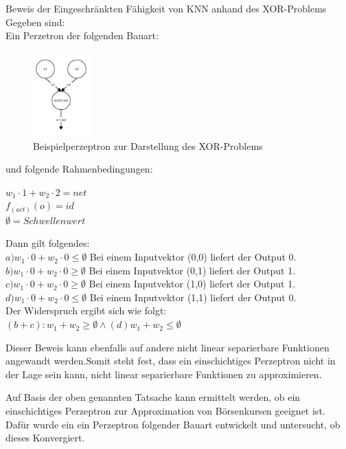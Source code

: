 \begin{bew}Beweis der Eingeschränkten Fähigkeit von KNN anhand des XOR-Problems\\

Gegeben sind:\\

Ein Perzetron der folgenden Bauart:

\begin{figure}[H]
\centering
		\includegraphics[width=0.20\textwidth]{Perzeptron.png}
	\caption{Beispielperzeptron zur Darstellung des XOR-Problems}
	\label{fig:Beispielperzeptron zur Darstellung des XOR-Problems}
\end{figure}

und folgende Rahmenbedingungen:

$w_1\cdot1 + w_2\cdot2 = net$\\ 
$f_(act)(o) = id$ \\
$\emptyset = Schwellenwert$

Dann gilt folgendes:\\
$a) w_1\cdot0 + w_2\cdot0 \le \emptyset$ Bei einem Inputvektor (0,0) liefert der Output 0.\\
$b) w_1\cdot0 + w_2\cdot0 \geq \emptyset$ Bei einem Inputvektor (0,1) liefert der Output 1.\\
$c) w_1\cdot0 + w_2\cdot0 \geq \emptyset$ Bei einem Inputvektor (1,0) liefert der Output 1.\\
$d) w_1\cdot0 + w_2\cdot0 \le \emptyset$ Bei einem Inputvektor (1,1) liefert der Output 0.\\

Der Widerspruch ergibt sich wie folgt:\\ $(b+c):  w_1 + w_2 \geq \emptyset  \wedge (d)  w_1 + w_2 \leq \emptyset$
\end{bew}

Dieser Beweis kann ebenfalls auf andere nicht linear separierbare Funktionen angewandt werden.Somit steht fest, dass ein einschichtiges Perzeptron nicht in der Lage sein kann, nicht linear separierbare Funktionen zu approximieren.

Auf Basis der oben genannten Tatsache kann ermittelt werden, ob ein einschichtiges Perzeptron zur Approximation von Börsenkursen geeignet ist. Dafür wurde ein ein Perzeptron folgender Bauart entwickelt und untersucht, ob dieses Konvergiert.

